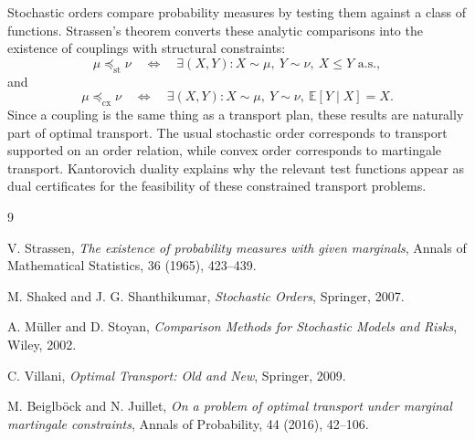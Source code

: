 \documentclass[11pt]{article}
\newcommand{\E}{\mathbb E}
\begin{document}
Stochastic orders compare probability measures by testing them against a class
of functions. Strassen's theorem converts these analytic comparisons into the
existence of couplings with structural constraints:
\[
        \mu\preceq_{\mathrm{st}}\nu
        \quad\Longleftrightarrow\quad
        \exists (X,Y): X\sim\mu,\ Y\sim\nu,\ X\leq Y\text{ a.s.},
\]
and
\[
        \mu\preceq_{\mathrm{cx}}\nu
        \quad\Longleftrightarrow\quad
        \exists (X,Y): X\sim\mu,\ Y\sim\nu,\ \E[Y\mid X]=X.
\]
Since a coupling is the same thing as a transport plan, these results are
naturally part of optimal transport. The usual stochastic order corresponds to
transport supported on an order relation, while convex order corresponds to
martingale transport. Kantorovich duality explains why the relevant test
functions appear as dual certificates for the feasibility of these constrained
transport problems.

\begin{thebibliography}{9}

V. Strassen,
\emph{The existence of probability measures with given marginals},
Annals of Mathematical Statistics, 36 (1965), 423--439.

M. Shaked and J. G. Shanthikumar,
\emph{Stochastic Orders},
Springer, 2007.

A. M\"uller and D. Stoyan,
\emph{Comparison Methods for Stochastic Models and Risks},
Wiley, 2002.

C. Villani,
\emph{Optimal Transport: Old and New},
Springer, 2009.

M. Beiglb\"ock and N. Juillet,
\emph{On a problem of optimal transport under marginal martingale constraints},
Annals of Probability, 44 (2016), 42--106.

\end{thebibliography}
\end{document}
